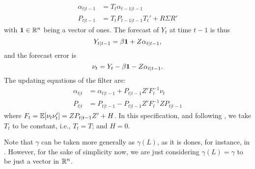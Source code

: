 \begin{align}
	\alpha_{t|t-1} &= T_t \alpha_{t-1|t-1}\\
	P_{t|t-1} &= T_t P_{t-1|t-1}T_t' + R\Sigma R'
\end{align}
with $\mathbf{1}\in\mathbb{R}^n$ being a vector of ones. The forecast of $Y_t$ at time $t-1$ is thus $$Y_{t|t-1} = \beta\mathbf{1} + Z\alpha_{t|t-1},$$ and the forecast error is $$\nu_t=Y_t-\beta\mathbf{1} - Z\alpha_{t|t-1}.$$ The updating equations of the filter are:
\begin{align}
	\alpha_{t|t} &= \alpha_{t|t-1} + P_{t|t-1} Z'F_t^{-1}\nu_t\\
	P_{t|t}& = P_{t|t-1} - P_{t|t-1}Z'F_t^{-1} Z P_{t|t-1}
\end{align}
where $F_t = \mathbb{E}[\nu_t\nu_t'] = Z P_{t|t-1}Z' + H$. In this specification, and following , we take $T_t$ to be constant, i.e., $T_t = T$; and $H=0$.


Note that $\gamma$ can be taken more generally as $\gamma(L)$, as it is dones, for instance, in . However, for the sake of simplicity now, we are just considering $\gamma(L) = \gamma$ to be just a vector in $\mathbb{R}^n$.